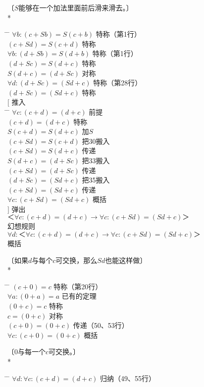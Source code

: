 \begin{center}
〔$S$能够在一个加法里面前后滑来滑去。〕\\
* \quad * \quad * \quad * \quad *
\end{center}
\begin{tabbing*}[]
\indent\indent \= \tabindent{-2em} \= \+\kill
$\forall b:(c+Sb)=S(c+b)$ \>特称（第1行）\\
$(c+Sd)=S(c+d)$ \>特称\\
$\forall b:(d+Sb)=S(d+b)$ \>特称（第1行）\\
$(d+Sc)=S(d+c)$ \>特称\\
$S(d+c)=(d+Sc)$ \>对称\\
$\forall d:(d+Sc)=(Sd+c)$ \>特称（第28行）\\
$(d+Sc)=(Sd+c)$ \>特称\\
$[$ \>推入\\
\pushtabs
  \quad \= \tabindent{-1em} \= \+\kill
  $\forall c:(c+d)=(d+c)$ \>前提\\
  $(c+d)=(d+c)$ \>特称\\
  $S(c+d)=S(d+c)$ \>加$S$\\
  $(c+Sd)=S(c+d)$ \>把30搬入\\
  $(c+Sd)=S(d+c)$ \>传递\\
  $S(d+c)=(d+Sc)$ \>把33搬入\\
  $(c+Sd)=(d+Sc)$ \>传递\\
  $(d+Sc)=(Sd+c)$ \>把35搬入\\
  $(c+Sd)=(Sd+c)$ \>传递\\
  $\forall c:(c+Sd)=(Sd+c)$ \>概括\-\\
\poptabs
$]$ \>弹出\\
$＜\forall c:(c+d)=(d+c)→\forall c:(c+Sd)=(Sd+c)＞$\\
  \>幻想规则\nonumber\\
$\forall d:＜\forall c:(c+d)=(d+c)→\forall c:(c+Sd)=(Sd+c)＞$\\
  \>概括\nonumber
\end{tabbing*}
\begin{center}
〔如果$d$与每个$c$可交换，那么$Sd$也能这样做〕\\
* \quad * \quad * \quad * \quad *
\end{center}
\begin{tabbing*}[]
\indent\indent \= \tabindent{-2em} \= \+\kill
$(c+0)=c$ \>特称（第20行）\\
$\forall a:(0+a)=a$ \>已有的定理\\
$(0+c)=c$ \>特称\\
$c=(0+c)$ \>对称\\
$(c+0)=(0+c)$ \>传递（50、53行）\\
$\forall c:(c+0)=(0+c)$ \>概括
\end{tabbing*}
\begin{center}
〔$0$与每一个$c$可交换。〕\\
* \quad * \quad * \quad * \quad *
\end{center}
\begin{tabbing*}[]
\indent\indent \= \tabindent{-2em} \= \+\kill
$\forall d:\forall c:(c+d)=(d+c)$ \>归纳（49、55行）
\end{tabbing*}

